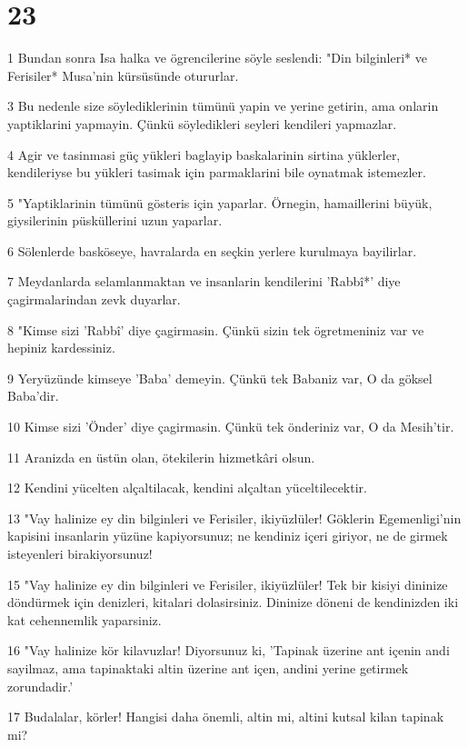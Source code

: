 \chapter{23}

\par 1 Bundan sonra Isa halka ve ögrencilerine söyle seslendi: "Din bilginleri* ve Ferisiler* Musa'nin kürsüsünde otururlar.
\par 3 Bu nedenle size söylediklerinin tümünü yapin ve yerine getirin, ama onlarin yaptiklarini yapmayin. Çünkü söyledikleri seyleri kendileri yapmazlar.
\par 4 Agir ve tasinmasi güç yükleri baglayip baskalarinin sirtina yüklerler, kendileriyse bu yükleri tasimak için parmaklarini bile oynatmak istemezler.
\par 5 "Yaptiklarinin tümünü gösteris için yaparlar. Örnegin, hamaillerini büyük, giysilerinin püsküllerini uzun yaparlar.
\par 6 Sölenlerde basköseye, havralarda en seçkin yerlere kurulmaya bayilirlar.
\par 7 Meydanlarda selamlanmaktan ve insanlarin kendilerini 'Rabbî*' diye çagirmalarindan zevk duyarlar.
\par 8 "Kimse sizi 'Rabbî' diye çagirmasin. Çünkü sizin tek ögretmeniniz var ve hepiniz kardessiniz.
\par 9 Yeryüzünde kimseye 'Baba' demeyin. Çünkü tek Babaniz var, O da göksel Baba'dir.
\par 10 Kimse sizi 'Önder' diye çagirmasin. Çünkü tek önderiniz var, O da Mesih'tir.
\par 11 Aranizda en üstün olan, ötekilerin hizmetkâri olsun.
\par 12 Kendini yücelten alçaltilacak, kendini alçaltan yüceltilecektir.
\par 13 "Vay halinize ey din bilginleri ve Ferisiler, ikiyüzlüler! Göklerin Egemenligi'nin kapisini insanlarin yüzüne kapiyorsunuz; ne kendiniz içeri giriyor, ne de girmek isteyenleri birakiyorsunuz!
\par 15 "Vay halinize ey din bilginleri ve Ferisiler, ikiyüzlüler! Tek bir kisiyi dininize döndürmek için denizleri, kitalari dolasirsiniz. Dininize döneni de kendinizden iki kat cehennemlik yaparsiniz.
\par 16 "Vay halinize kör kilavuzlar! Diyorsunuz ki, 'Tapinak üzerine ant içenin andi sayilmaz, ama tapinaktaki altin üzerine ant içen, andini yerine getirmek zorundadir.'
\par 17 Budalalar, körler! Hangisi daha önemli, altin mi, altini kutsal kilan tapinak mi?
